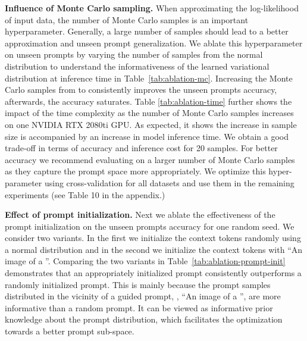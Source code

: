 \documentclass[10pt,twocolumn,letterpaper]{article}
\begin{document}
\textbf{Influence of Monte Carlo sampling.}
When approximating the log-likelihood of input data, the number of Monte Carlo samples is an important hyperparameter. Generally, a large number of samples should lead to a better approximation and unseen prompt generalization. We ablate this hyperparameter on unseen prompts by varying the number of samples from the normal distribution  to understand the informativeness of the learned variational distribution at inference time in Table~\ref{tab:ablation-mc}. Increasing the Monte Carlo samples from  to   consistently improves the unseen prompts accuracy, afterwards, the accuracy saturates. 
Table \ref{tab:ablation-time} further shows the impact of the time complexity as the number of Monte Carlo samples increases on one
NVIDIA RTX 2080ti GPU. As expected, it shows the increase in sample size is accompanied by an increase in model inference time. We obtain a good trade-off in terms of accuracy and inference cost for 20 samples. For better accuracy we recommend evaluating on a larger number of Monte Carlo samples as they capture the prompt space more appropriately. We optimize this hyper-parameter using cross-validation for all datasets and use them in the remaining experiments (see Table 10 in the appendix.) 











\textbf{Effect of prompt initialization.}
Next we ablate the effectiveness of the prompt initialization on the unseen prompts accuracy for one random seed. We consider two variants. In the first we initialize the context tokens randomly using a normal distribution and in the second we initialize the context tokens with ``An image of a ''. Comparing the two variants in Table~\ref{tab:ablation-prompt-init} demonstrates that an appropriately initialized prompt consistently outperforms a randomly initialized prompt. This is mainly because the prompt samples distributed in the vicinity of a guided prompt, \eg, ``An image of a '', are more informative than a random prompt. It can be viewed as informative prior knowledge about the prompt distribution, which facilitates the optimization towards a better prompt sub-space. 
\end{document}
